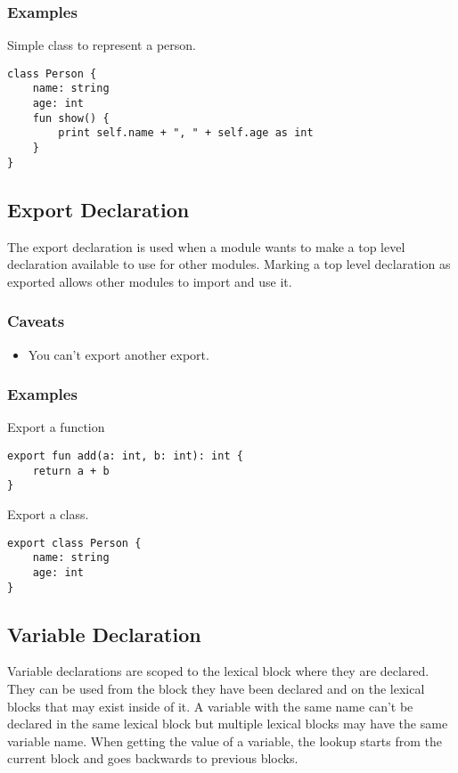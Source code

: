 \subsubsection{Examples}

Simple class to represent a person.
\begin{lstlisting}
class Person {
    name: string
    age: int
    fun show() {
        print self.name + ", " + self.age as int
    }
}
\end{lstlisting}

\subsection{Export Declaration}

The export declaration is used when a module wants to make a top level declaration available to use for other
modules. Marking a top level declaration as exported allows other modules to import and use it.

\subsubsection{Caveats}

\begin{itemize}
    \item You can't export another export.
\end{itemize}

\subsubsection{Examples}

Export a function
\begin{lstlisting}
export fun add(a: int, b: int): int {
    return a + b
}
\end{lstlisting}
Export a class.
\begin{lstlisting}
export class Person {
    name: string
    age: int
}
\end{lstlisting}

\subsection{Variable Declaration}

Variable declarations are scoped to the lexical block where they are declared. They can be used from the block they have been declared and
on the lexical blocks that may exist inside of it. A variable with the same name can't be declared in the same lexical block but multiple lexical
blocks may have the same variable name. When getting the value of a variable, the lookup starts from the current block and goes backwards to previous blocks.

